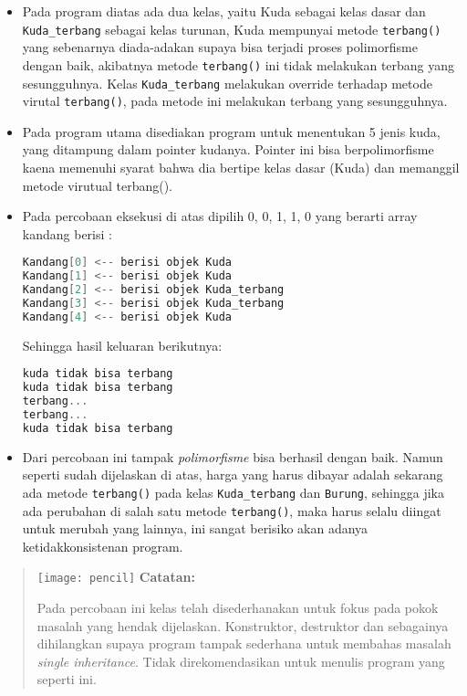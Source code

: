\begin{itemize}
\item
  Pada program diatas ada dua kelas, yaitu Kuda sebagai kelas dasar dan
  \texttt{Kuda\_terbang} sebagai kelas turunan, Kuda mempunyai metode
  \texttt{terbang()} yang sebenarnya diada-adakan supaya bisa terjadi
  proses polimorfisme dengan baik, akibatnya metode \texttt{terbang()}
  ini tidak melakukan terbang yang sesungguhnya. Kelas
  \texttt{Kuda\_terbang} melakukan override terhadap metode virutal
  \texttt{terbang()}, pada metode ini melakukan terbang yang
  sesungguhnya.
\item
  Pada program utama disediakan program untuk menentukan 5 jenis kuda,
  yang ditampung dalam pointer kudanya. Pointer ini bisa berpolimorfisme
  kaena memenuhi syarat bahwa dia bertipe kelas dasar (Kuda) dan
  memanggil metode virutual terbang().
\item
  Pada percobaan eksekusi di atas dipilih 0, 0, 1, 1, 0 yang berarti
  array kandang berisi :

\begin{lstlisting}[language=c++, numbers=none]
Kandang[0] <-- berisi objek Kuda 
Kandang[1] <-- berisi objek Kuda 
Kandang[2] <-- berisi objek Kuda_terbang 
Kandang[3] <-- berisi objek Kuda_terbang 
Kandang[4] <-- berisi objek Kuda 
\end{lstlisting}

  Sehingga hasil keluaran berikutnya:

\begin{lstlisting}[language=c++, numbers=none]
kuda tidak bisa terbang 
kuda tidak bisa terbang 
terbang... 
terbang... 
kuda tidak bisa terbang
\end{lstlisting}
\item
  Dari percobaan ini tampak \emph{polimorfisme} bisa berhasil dengan
  baik. Namun seperti sudah dijelaskan di atas, harga yang harus dibayar
  adalah sekarang ada metode \texttt{terbang()} pada kelas
  \texttt{Kuda\_terbang} dan \texttt{Burung}, sehingga jika ada
  perubahan di salah satu metode \texttt{terbang()}, maka harus selalu
  diingat untuk merubah yang lainnya, ini sangat berisiko akan adanya
  ketidakkonsistenan program.
\end{itemize}
\begin{quotation}
\texttt{[image: pencil]}	\textbf{Catatan:}
	
	Pada
	percobaan ini kelas telah disederhanakan untuk fokus pada pokok masalah
	yang hendak dijelaskan. Konstruktor, destruktor dan sebagainya
	dihilangkan supaya program tampak sederhana untuk membahas masalah
	\emph{single inheritance}. Tidak direkomendasikan untuk menulis program
	yang seperti ini.
\end{quotation}


